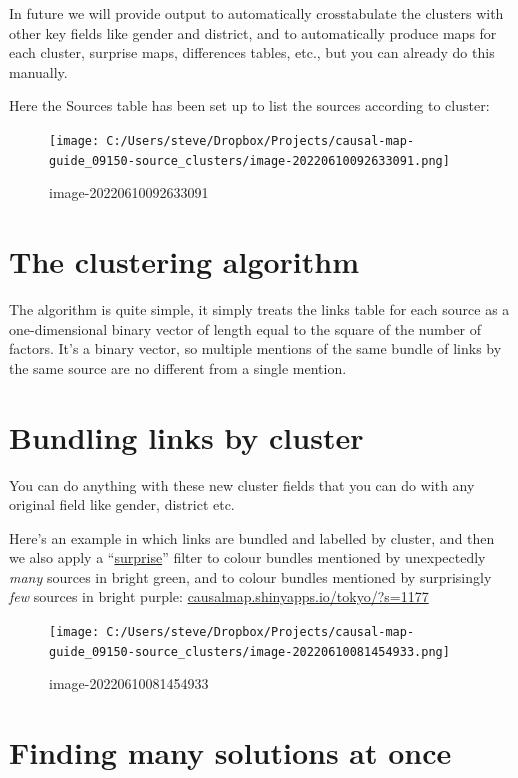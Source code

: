 \documentclass[
]{book}
\begin{document}
In future we will provide output to automatically crosstabulate the clusters with other key fields like gender and district, and to automatically produce maps for each cluster, surprise maps, differences tables, etc., but you can already do this manually.

Here the Sources table has been set up to list the sources according to cluster:

\begin{figure}
\centering
\texttt{[image: C:/Users/steve/Dropbox/Projects/causal-map-guide\_09150-source\_clusters/image-20220610092633091.png]}
\caption{image-20220610092633091}
\end{figure}

\hypertarget{the-clustering-algorithm}{%
\section{The clustering algorithm}\label{the-clustering-algorithm}}

The algorithm is quite simple, it simply treats the links table for each source as a one-dimensional binary vector of length equal to the square of the number of factors. It's a binary vector, so multiple mentions of the same bundle of links by the same source are no different from a single mention.

\hypertarget{bundling-links-by-cluster}{%
\section{Bundling links by cluster}\label{bundling-links-by-cluster}}

You can do anything with these new cluster fields that you can do with any original field like gender, district etc.

Here's an example in which links are bundled and labelled by cluster, and then we also apply a ``\protect\hyperlink{xsurprise}{surprise}'' filter to colour bundles mentioned by unexpectedly \emph{many} sources in bright green, and to colour bundles mentioned by surprisingly \emph{few} sources in bright purple: \url{causalmap.shinyapps.io/tokyo/?s=1177}

\begin{figure}
\centering
\texttt{[image: C:/Users/steve/Dropbox/Projects/causal-map-guide\_09150-source\_clusters/image-20220610081454933.png]}
\caption{image-20220610081454933}
\end{figure}

\hypertarget{finding-many-solutions-at-once}{%
\section{Finding many solutions at once}\label{finding-many-solutions-at-once}}
\end{document}
